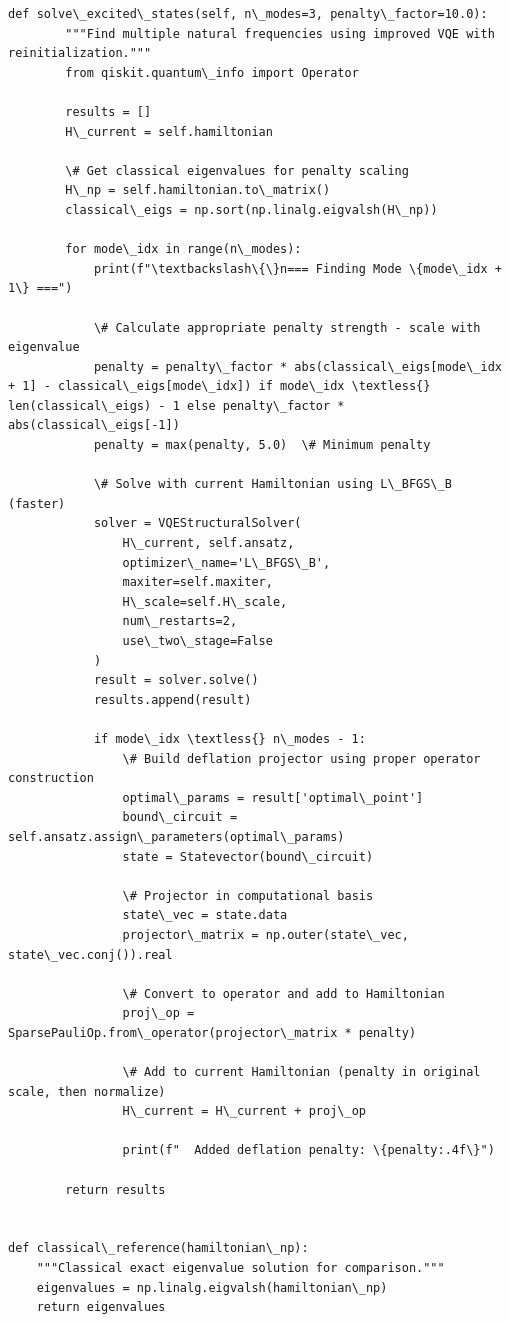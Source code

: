 \documentclass[12pt, a4paper]{article}
\begin{document}
\begin{lstlisting}[style=codestyle, caption={{vqe_runner.py --- VQE Solver}}]
    def solve\_excited\_states(self, n\_modes=3, penalty\_factor=10.0):
        """Find multiple natural frequencies using improved VQE with reinitialization."""
        from qiskit.quantum\_info import Operator

        results = []
        H\_current = self.hamiltonian
        
        \# Get classical eigenvalues for penalty scaling
        H\_np = self.hamiltonian.to\_matrix()
        classical\_eigs = np.sort(np.linalg.eigvalsh(H\_np))
        
        for mode\_idx in range(n\_modes):
            print(f"\textbackslash\{\}n=== Finding Mode \{mode\_idx + 1\} ===")

            \# Calculate appropriate penalty strength - scale with eigenvalue
            penalty = penalty\_factor * abs(classical\_eigs[mode\_idx + 1] - classical\_eigs[mode\_idx]) if mode\_idx \textless{} len(classical\_eigs) - 1 else penalty\_factor * abs(classical\_eigs[-1])
            penalty = max(penalty, 5.0)  \# Minimum penalty

            \# Solve with current Hamiltonian using L\_BFGS\_B (faster)
            solver = VQEStructuralSolver(
                H\_current, self.ansatz,
                optimizer\_name='L\_BFGS\_B',
                maxiter=self.maxiter,
                H\_scale=self.H\_scale,
                num\_restarts=2,
                use\_two\_stage=False
            )
            result = solver.solve()
            results.append(result)

            if mode\_idx \textless{} n\_modes - 1:
                \# Build deflation projector using proper operator construction
                optimal\_params = result['optimal\_point']
                bound\_circuit = self.ansatz.assign\_parameters(optimal\_params)
                state = Statevector(bound\_circuit)
                
                \# Projector in computational basis
                state\_vec = state.data
                projector\_matrix = np.outer(state\_vec, state\_vec.conj()).real
                
                \# Convert to operator and add to Hamiltonian
                proj\_op = SparsePauliOp.from\_operator(projector\_matrix * penalty)
                
                \# Add to current Hamiltonian (penalty in original scale, then normalize)
                H\_current = H\_current + proj\_op
                
                print(f"  Added deflation penalty: \{penalty:.4f\}")

        return results


def classical\_reference(hamiltonian\_np):
    """Classical exact eigenvalue solution for comparison."""
    eigenvalues = np.linalg.eigvalsh(hamiltonian\_np)
    return eigenvalues

\end{lstlisting}
\end{document}
